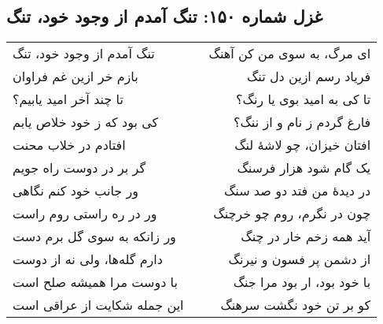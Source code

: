 \begin{center}
\section*{غزل شماره ۱۵۰: تنگ آمدم از وجود خود، تنگ}
\label{sec:150}
\begin{longtable}{l p{0.5cm} r}
تنگ آمدم از وجود خود، تنگ
&&
ای مرگ، به سوی من کن آهنگ
\\
بازم خر ازین غم فراوان
&&
فریاد رسم ازین دل تنگ
\\
تا چند آخر امید یابیم؟
&&
تا کی به امید بوی یا رنگ؟
\\
کی بود که ز خود خلاص یابم
&&
فارغ گردم ز نام و از ننگ؟
\\
افتادم در خلاب محنت
&&
افتان خیزان، چو لاشهٔ لنگ
\\
گر بر در دوست راه جویم
&&
یک گام شود هزار فرسنگ
\\
ور جانب خود کنم نگاهی
&&
در دیدهٔ من فتد دو صد سنگ
\\
ور در ره راستی روم راست
&&
چون در نگرم، روم چو خرچنگ
\\
ور زانکه به سوی گل برم دست
&&
آید همه زخم خار در چنگ
\\
دارم گله‌ها، ولی نه از دوست
&&
از دشمن پر فسون و نیرنگ
\\
با دوست مرا همیشه صلح است
&&
با خود بود، ار بود مرا جنگ
\\
این جمله شکایت از عراقی است
&&
کو بر تن خود نگشت سرهنگ
\\
\end{longtable}
\end{center}
